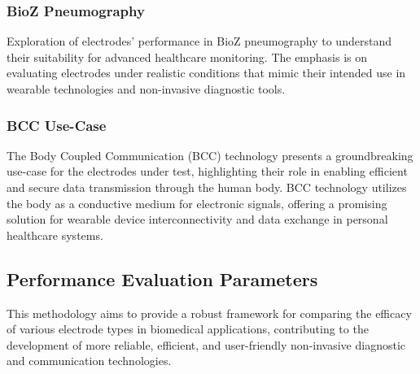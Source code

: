 \documentclass[conference]{IEEEtran}
\begin{document}
\subsubsection{BioZ Pneumography}
Exploration of electrodes' performance in BioZ pneumography to understand their suitability for advanced healthcare monitoring. The emphasis is on evaluating electrodes under realistic conditions that mimic their intended use in wearable technologies and non-invasive diagnostic tools.

\subsubsection{BCC Use-Case}
The Body Coupled Communication (BCC) technology presents a groundbreaking use-case for the electrodes under test, highlighting their role in enabling efficient and secure data transmission through the human body. BCC technology utilizes the body as a conductive medium for electronic signals, offering a promising solution for wearable device interconnectivity and data exchange in personal healthcare systems. 



\subsection{Performance Evaluation Parameters}
This methodology aims to provide a robust framework for comparing the efficacy of various electrode types in biomedical applications, contributing to the development of more reliable, efficient, and user-friendly non-invasive diagnostic and communication technologies. 
\end{document}
